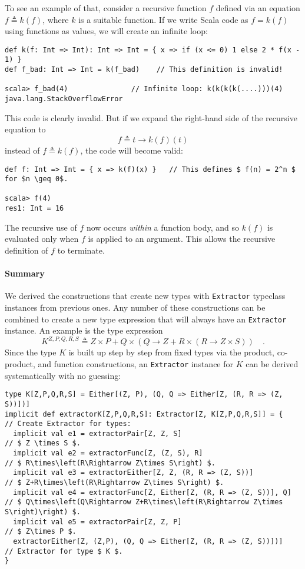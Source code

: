 To see an example of that, consider a recursive function $f$ defined
via an equation $f\triangleq k(f)$, where $k$ is a suitable function.
If we write Scala code as $f=k(f)$ using functions as values, we
will create an infinite loop:
\begin{lstlisting}[mathescape=true]
def k(f: Int => Int): Int => Int = { x => if (x <= 0) 1 else 2 * f(x - 1) }
def f_bad: Int => Int = k(f_bad)    // This definition is invalid!

scala> f_bad(4)               // Infinite loop: k(k(k(k(....)))(4)
java.lang.StackOverflowError
\end{lstlisting}
This code is clearly invalid. But if we expand the right-hand side
of the recursive equation to 
\[
f\triangleq t\rightarrow k(f)(t)
\]
instead of $f\triangleq k(f)$, the code will become valid:
\begin{lstlisting}[mathescape=true]
def f: Int => Int = { x => k(f)(x) }   // This defines $ f(n) = 2^n $ for $n \geq 0$.

scala> f(4)
res1: Int = 16
\end{lstlisting}
The recursive use of $f$ now occurs \emph{within} a function body,
and so $k(f)$ is evaluated only when $f$ is applied to an argument.
This allows the recursive definition of $f$ to terminate.

\paragraph{Summary}

We derived the constructions that create new types with \lstinline!Extractor!
typeclass instances from previous ones. Any number of these constructions
can be combined to create a new type expression that will always have
an \lstinline!Extractor! instance. An example is the type expression
\[
K^{Z,P,Q,R,S}\triangleq Z\times P+Q\times\left(Q\rightarrow Z+R\times\left(R\rightarrow Z\times S\right)\right)\quad.
\]
Since the type $K$ is built up step by step from fixed types via
the product, co-product, and function constructions, an \lstinline!Extractor!
instance for $K$ can be derived systematically with no guessing:
\begin{lstlisting}[mathescape=true]
type K[Z,P,Q,R,S] = Either[(Z, P), (Q, Q => Either[Z, (R, R => (Z, S))])]
implicit def extractorK[Z,P,Q,R,S]: Extractor[Z, K[Z,P,Q,R,S]] = {    // Create Extractor for types:
  implicit val e1 = extractorPair[Z, Z, S]                            // $ Z \times S $.
  implicit val e2 = extractorFunc[Z, (Z, S), R]                       // $ R\times\left(R\Rightarrow Z\times S\right) $.
  implicit val e3 = extractorEither[Z, Z, (R, R => (Z, S))]           // $ Z+R\times\left(R\Rightarrow Z\times S\right) $.
  implicit val e4 = extractorFunc[Z, Either[Z, (R, R => (Z, S))], Q]  // $ Q\times\left(Q\Rightarrow Z+R\times\left(R\Rightarrow Z\times S\right)\right) $.
  implicit val e5 = extractorPair[Z, Z, P]                            // $ Z\times P $.
  extractorEither[Z, (Z,P), (Q, Q => Either[Z, (R, R => (Z, S))])]    // Extractor for type $ K $.
}
\end{lstlisting}

